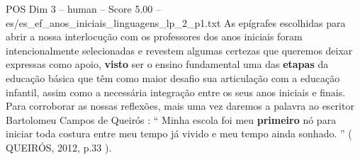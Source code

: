 \begin{textsample}{POS Dim 3 – human – Score 5.00 – es/es\_ef\_anos\_iniciais\_linguagens\_lp\_2\_p1.txt}  \label{ex:f3_pos_018}
As epígrafes escolhidas para abrir a nossa interlocução com os professores dos anos iniciais foram intencionalmente selecionadas e revestem algumas certezas que queremos deixar expressas como apoio, \textbf{visto} ser o ensino fundamental uma das \textbf{etapas} da educação básica que têm como maior desafio sua articulação com a educação infantil, assim como a necessária integração entre os seus anos iniciais e finais.
Para corroborar as nossas reflexões, mais uma vez daremos a palavra ao escritor Bartolomeu Campos de Queirós : “ Minha escola foi meu \textbf{primeiro} nó para iniciar toda costura entre meu tempo já vivido e meu tempo ainda sonhado. ” ( QUEIRÓS, 2012, p.33 ).

\end{textsample}
